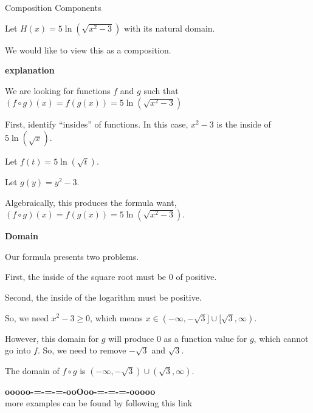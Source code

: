 \documentclass{ximera}
\begin{document}
\begin{example} Composition Components


Let $H(x) = 5 \ln(\sqrt{x^2-3})$ with its natural domain. 


We would like to view this as a composition. 



\textbf{\textcolor{red!75!green}{explanation}} 


We are looking for functions $f$ and $g$ such that $(f \circ g)(x) = f(g(x)) = 5 \ln(\sqrt{x^2-3})$ 


First, identify ``insides'' of functions.  In this case, $x^2 - 3$ is the inside of $5 \ln(\sqrt{x})$. 




Let $f(t) = 5 \ln(\sqrt{t})$. 

Let $g(y) = y^2 - 3$. 


Algebraically, this produces the formula want, $(f \circ g)(x) = f(g(x)) = 5 \ln(\sqrt{x^2-3})$.










\begin{observation} \textbf{\textcolor{-red!75}{Domain}}

Our formula presents two problems.

First, the inside of the square root must be $0$ of positive.

Second, the inside of the logarithm must be positive. 



So, we need $x^2 - 3 \geq 0 $, which means $x \in (-\infty, -\sqrt{3}] \cup [\sqrt{3}, \infty)$. 


However, this domain for $g$ will produce $0$ as a function value for $g$, which cannot go into $f$.  So, we need to remove $-\sqrt{3}$ and $\sqrt{3}$.




The domain of $f \circ g$ is $(-\infty, -\sqrt{3}) \cup (\sqrt{3}, \infty)$.




\end{observation}


\end{example}























\begin{center}
\textbf{\textcolor{green!50!black}{ooooo-=-=-=-ooOoo-=-=-=-ooooo}} \\

more examples can be found by following this link\\ 

\end{center}
\end{document}
